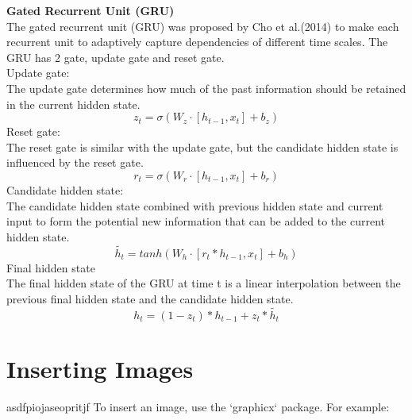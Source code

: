 \documentclass[12pt,a4paper]{article}
\begin{document}
\newpage
\textbf{Gated Recurrent Unit (GRU)}
\\[1ex]
The gated recurrent unit (GRU) was proposed by Cho et al.(2014) to make each recurrent unit to adaptively capture dependencies of different time scales. The GRU has 2 gate, update gate and reset gate. 
\\[2ex]
Update gate:
\\[1ex]
The update gate determines how much of the past information should be retained in the current hidden state. 
\begin{equation}
    z_t = \sigma(W_z \cdot [ h_{t-1} , x_t ] + b_z )
\end{equation}
Reset gate:
\\[1ex]
The reset gate is similar with the update gate, but the candidate hidden state is influenced by the reset gate. 
\begin{equation}
    r_t = \sigma( W_r \cdot [ h_{t-1} , x_t ] + b_r )
\end{equation}
Candidate hidden state:
\\[1ex]
The candidate hidden state combined with previous hidden state and current input to form the potential new information that can be added to the current hidden state.
\begin{equation}
    \widetilde{h_t} = tanh ( W_h \cdot [ r_t * h_{t-1} , x_t ] + b_h )
\end{equation}
Final hidden state
\\[1ex]
The final hidden state of the GRU at time t is a linear interpolation between the previous final hidden state and the candidate hidden state. 
\begin{equation}
    h_t = ( 1 - z_t ) * h_{t-1} + z_t * \widetilde{ h_t }
\end{equation}




\section{Inserting Images}
asdfpiojaseopritjf
To insert an image, use the `graphicx` package. For example:
\end{document}
